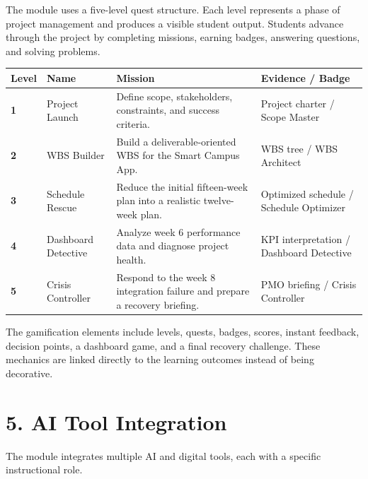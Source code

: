 \documentclass[11pt,a4paper]{article}
\begin{document}
The module uses a five-level quest structure. Each level represents a phase of project management and produces a visible student output. Students advance through the project by completing missions, earning badges, answering questions, and solving problems.

\begin{longtable}{>{\bfseries}p{1.8cm}p{3.3cm}p{5.2cm}p{3.3cm}}
\textbf{Level} & \textbf{Name} & \textbf{Mission} & \textbf{Evidence / Badge} \\
\hline
1 & Project Launch & Define scope, stakeholders, constraints, and success criteria. & Project charter / Scope Master \\
2 & WBS Builder & Build a deliverable-oriented WBS for the Smart Campus App. & WBS tree / WBS Architect \\
3 & Schedule Rescue & Reduce the initial fifteen-week plan into a realistic twelve-week plan. & Optimized schedule / Schedule Optimizer \\
4 & Dashboard Detective & Analyze week 6 performance data and diagnose project health. & KPI interpretation / Dashboard Detective \\
5 & Crisis Controller & Respond to the week 8 integration failure and prepare a recovery briefing. & PMO briefing / Crisis Controller \\
\end{longtable}

The gamification elements include levels, quests, badges, scores, instant feedback, decision points, a dashboard game, and a final recovery challenge. These mechanics are linked directly to the learning outcomes instead of being decorative.

\section*{5. AI Tool Integration}

The module integrates multiple AI and digital tools, each with a specific instructional role.
\end{document}
